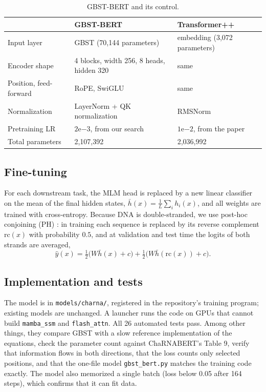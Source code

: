 \documentclass{article}
\begin{document}
\begin{table}[h]
  \caption{GBST-BERT and its control.}
  \label{tab:control}
  \centering
  \small
  \setlength{\tabcolsep}{4pt}
  \begin{tabular}{lll}
    \toprule
    & GBST-BERT & Transformer++ \\
    \midrule
    Input layer & GBST (70,144 parameters) & embedding (3,072 parameters) \\
    Encoder shape & 4 blocks, width 256, 8 heads, hidden 320 & same \\
    Position, feed-forward & RoPE, SwiGLU & same \\
    Normalization & LayerNorm + QK normalization & RMSNorm \\
    Pretraining LR & $2\mathrm{e}{-3}$, from our search & $1\mathrm{e}{-2}$, from the paper \\
    Total parameters & 2,107,392 & 2,036,992 \\
    \bottomrule
  \end{tabular}
\end{table}

\subsection{Fine-tuning}\label{sec:ft}

For each downstream task, the MLM head is replaced by a new linear classifier on the mean of the final
hidden states, $\bar h(x)=\frac{1}{L}\sum_i h_i(x)$, and all weights are trained with cross-entropy.
Because DNA is double-stranded, we use post-hoc conjoining (PH) \citep{schiff2024caduceus}: in training
each sequence is replaced by its reverse complement $\mathrm{rc}(x)$ with probability $0.5$, and at
validation and test time the logits of both strands are averaged,
\begin{equation}
  \hat y(x) = \tfrac{1}{2}\big(W\bar h(x)+c\big)+\tfrac{1}{2}\big(W\bar h(\mathrm{rc}(x))+c\big).
\end{equation}

\subsection{Implementation and tests}

The model is in \texttt{models/charna/}, registered in the repository's training program; existing
models are unchanged. A launcher runs the code on GPUs that cannot build \texttt{mamba\_ssm} and
\texttt{flash\_attn}. All 26 automated tests pass. Among other things, they compare GBST with a slow
reference implementation of the equations, check the parameter count against ChaRNABERT's Table 9,
verify that information flows in both directions, that the loss counts only selected positions, and
that the one-file model \texttt{gbst\_bert.py} matches the training code exactly. The model also
memorized a single batch (loss below 0.05 after 164 steps), which confirms that it can fit data.
\end{document}
